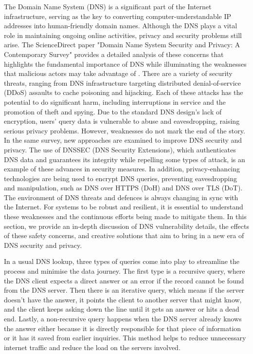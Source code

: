 The Domain Name System (DNS) is a significant part of the Internet infrastructure, serving as the key to converting computer-understandable IP addresses into human-friendly domain names. Although the DNS plays a vital role in maintaining ongoing online activities, privacy and security problems still arise. The ScienceDirect paper "Domain Name System Security and Privacy: A Contemporary Survey" provides a detailed analysis of these concerns that highlights the fundamental importance of DNS while illuminating the weaknesses that malicious actors may take advantage of \cite * {Sciencedirect2023dns}. There are a variety of security threats, ranging from DNS infrastructure targeting distributed denial-of-service (DDoS) assaults to cache poisoning and hijacking. Each of these attacks has the potential to do significant harm, including interruptions in service and the promotion of theft and spying. Due to the standard DNS design's lack of encryption, users' query data is vulnerable to abuse and eavesdropping, raising serious privacy problems. However, weaknesses do not mark the end of the story. In the same survey, new approaches are examined to improve DNS security and privacy. The use of DNSSEC (DNS Security Extensions), which authenticates DNS data and guarantees its integrity while repelling some types of attack, is an example of these advances in security measures. In addition, privacy-enhancing technologies are being used to encrypt DNS queries, preventing eavesdropping and manipulation, such as DNS over HTTPS (DoH) and DNS over TLS (DoT). The environment of DNS threats and defences is always changing in sync with the Internet. For systems to be robust and resilient, it is essential to understand these weaknesses and the continuous efforts being made to mitigate them. In this section, we provide an in-depth discussion of DNS vulnerability details, the effects of these safety concerns, and creative solutions that aim to bring in a new era of DNS security and privacy.

In a usual DNS lookup, three types of queries come into play to streamline the process and minimise the data journey. The first type is a recursive query, where the DNS client expects a direct answer or an error if the record cannot be found from the DNS server. Then there is an iterative query, which means if the server doesn't have the answer, it points the client to another server that might know, and the client keeps asking down the line until it gets an answer or hits a dead end. Lastly, a non-recursive query happens when the DNS server already knows the answer either because it is directly responsible for that piece of information or it has it saved from earlier inquiries. This method helps to reduce unnecessary internet traffic and reduce the load on the servers involved.

